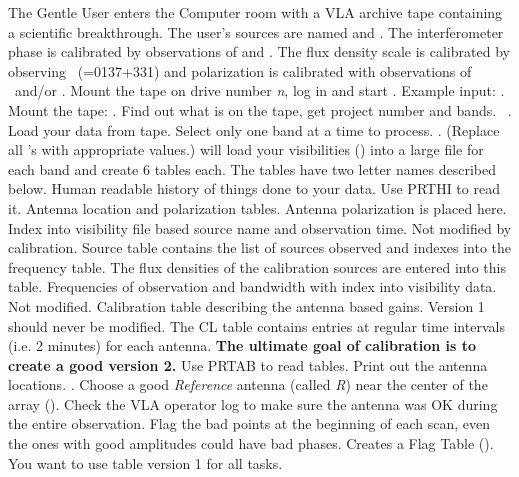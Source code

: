 The Gentle User enters the Computer room with a VLA archive tape
containing a scientific breakthrough.  The user's sources are named
 and .  The interferometer phase is
calibrated by observations of  and .  The flux
density scale is calibrated by observing \TCTES\ (=0137+331) and
polarization is calibrated with observations of \TCPCL\ and/or \TCOTE.
Mount the tape on drive number {\it n}, log in and start \AIPS. Example
input: .  Mount the tape:
.
\beddes
{} Find out what is on the tape, get project number
   and bands.~
.
 Load your data from tape.
Select only one band at a time to process.
.
(Replace all 's with appropriate values.)  will
load your visibilities (\uvdata) into a large file for each band and
create 6 \AIPS tables each.  The tables have two letter names
described below.
\tablestyle
\beddes
{} Human readable history of things done to your data.
Use PRTHI to read it.
 Antenna location and polarization tables.  Antenna
polarization  is placed here.
 Index into visibility file based source name and
observation time.  Not modified by calibration.
 Source table contains the list of sources observed
and indexes into the frequency table.  The flux densities of the
calibration sources are entered into this table.
 Frequencies of observation and bandwidth with index
into visibility data. Not modified.
 Calibration table describing the antenna based gains.
Version 1 should never be modified.
The CL table contains entries at regular time intervals (i.e. 2
minutes) for each antenna.
{\bf The ultimate goal of calibration is to create a good \CL version 2.}
Use PRTAB to read tables.
\eeddes
\normalstyle
{} Print out the antenna locations.
.
Choose a good {\it Reference} antenna (called {\it R})
near the center of the array ().
Check the VLA operator log to make sure the antenna was OK
during the entire observation.
 Flag the bad points at the beginning of each
scan, even the ones with good amplitudes could have bad phases.
Creates a Flag Table ().  You want to use
 table version 1 for all tasks.

